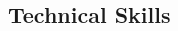 \documentclass[12pt]{article} %
\begin{document}
\begin{paracol}{2}


\section{Technical Skills} 





	
	
	
	
	
	
	
	


\end{paracol}
\end{document}
